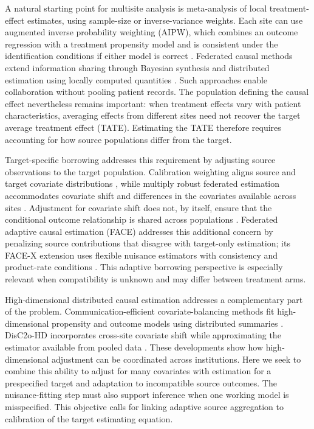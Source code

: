 \documentclass[12pt]{article}
\begin{document}
A natural starting point for multisite analysis is meta-analysis of local treatment-effect estimates, using sample-size or inverse-variance weights. Each site can use augmented inverse probability weighting (AIPW), which combines an outcome regression with a treatment propensity model and is consistent under the identification conditions if either model is correct \citep{robins1994estimation,bang2005doubly}. Federated causal methods extend information sharing through Bayesian synthesis and distributed estimation using locally computed quantities \citep{vo2022bayesian,xiong2023federated}. Such approaches enable collaboration without pooling patient records. The population defining the causal effect nevertheless remains important: when treatment effects vary with patient characteristics, averaging effects from different sites need not recover the target average treatment effect (TATE). Estimating the TATE therefore requires accounting for how source populations differ from the target.

Target-specific borrowing addresses this requirement by adjusting source observations to the target population. Calibration weighting aligns source and target covariate distributions \citep{josey2022calibration,chattopadhyay2024one}, while multiply robust federated estimation accommodates covariate shift and differences in the covariates available across sites \citep{Han2023multiply}. Adjustment for covariate shift does not, by itself, ensure that the conditional outcome relationship is shared across populations \citep{cole2010generalizing,pearl2014external,dahabreh2019generalizing}. Federated adaptive causal estimation (FACE) addresses this additional concern by penalizing source contributions that disagree with target-only estimation; its FACE-X extension uses flexible nuisance estimators with consistency and product-rate conditions \citep{han2025federated}. This adaptive borrowing perspective is especially relevant when compatibility is unknown and may differ between treatment arms.

High-dimensional distributed causal estimation addresses a complementary part of the problem. Communication-efficient covariate-balancing methods fit high-dimensional propensity and outcome models using distributed summaries \citep{wang2024communication}. DisC2o-HD incorporates cross-site covariate shift while approximating the estimator available from pooled data \citep{Tong2025disc2o}. These developments show how high-dimensional adjustment can be coordinated across institutions. Here we seek to combine this ability to adjust for many covariates with estimation for a prespecified target and adaptation to incompatible source outcomes. The nuisance-fitting step must also support inference when one working model is misspecified. This objective calls for linking adaptive source aggregation to calibration of the target estimating equation.
\end{document}
